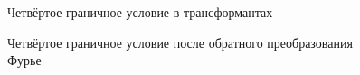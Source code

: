 \documentclass[a4paper, 12pt]{article}
\begin{document}
\begin{figure}[h!]
\noindent{}
\caption{Четвёртое граничное условие в трансформантах}
\label{figCurves}
\end{figure}

\begin{figure}[h!]
\noindent{}
\caption{Четвёртое граничное условие после обратного преобразования Фурье}
\label{figCurves}
\end{figure}
\end{document}
